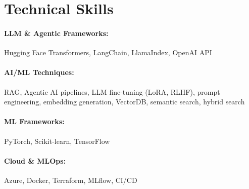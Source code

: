 \documentclass[10pt, letterpaper]{article}
\newenvironment{onecolentry}{
    \begin{adjustwidth}{
        0 cm + 0.00001 cm
    }{
        0 cm + 0.00001 cm
    }
}{
    \end{adjustwidth}
} %
\begin{document}
        




\vspace{-1mm}
\section{Technical Skills}

        \paragraph{LLM \& Agentic Frameworks:} Hugging Face Transformers, LangChain, LlamaIndex, OpenAI API
        \vspace{-4mm}
        \paragraph{AI/ML Techniques:} RAG, Agentic AI pipelines, LLM fine-tuning (LoRA, RLHF), prompt engineering, embedding generation, VectorDB, semantic search, hybrid search
        \vspace{-4mm}
        \paragraph{ML Frameworks:} PyTorch, Scikit-learn, TensorFlow
        \vspace{-4mm}
        \paragraph{Cloud \& MLOps:} Azure, Docker, Terraform, MLflow, CI/CD
        \vspace{-4mm}
\end{document}
